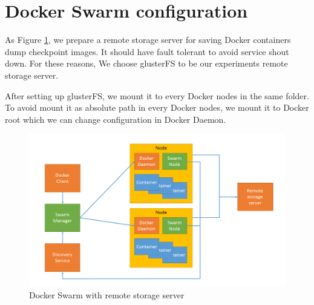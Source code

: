 \section{Docker Swarm configuration}
As Figure \ref{fig:Docker Swarm with remote storage server}, we prepare a remote storage server for saving Docker containers dump checkpoint images. It should have fault tolerant to avoid service shout down. For these reasons, We choose glusterFS to be our experiments remote storage server.                            

After setting up glusterFS, we mount it to every Docker nodes in the same folder. To avoid mount it as absolute path in every Docker nodes, we mount it to Docker root which we can change configuration in Docker Daemon.

\begin{figure}[h]
\begin{center}
\includegraphics[width=15cm]{figure/swarm_docker_remote.png}
\end{center}
\caption{Docker Swarm with remote storage server}
\label{fig:Docker Swarm with remote storage server}
\end{figure}

